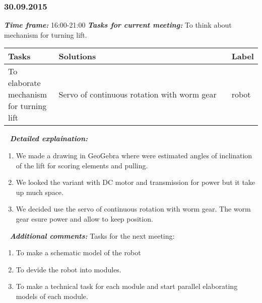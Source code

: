 \subsubsection{30.09.2015}
	\textit{\textbf{Time frame:}} 16:00-21:00 \newline
	\textit{\textbf{Tasks for current meeting:}} To think about mechanism for turning lift.

  \begin{table}[H]
	\vspace{-2mm}
	\begin{center}
		\begin{tabular}{|p{0.2\linewidth}|p{0.7\linewidth}|p{0.1\linewidth}|}
			\hline
			Tasks & Solutions & Label \\
			\hline
			To elaborate mechanism for turning lift & Servo of continuous rotation with worm gear & robot \\
			\hline
		\end{tabular}
	\end{center}
  \end{table}
  
   \newline
  \textit{\textbf{Detailed explaination:}}
  \begin{enumerate}
  	\item We made a drawing in GeoGebra where were estimated angles of inclination of the lift for scoring elements and pulling.
  	
  	\item We looked the variant with DC motor and transmission for power but it take up much space.
  	
  	\item We decided use the servo of continuous rotation with worm gear. The worm gear esure power and allow to keep position.
  	

  \end{enumerate}
  
   \newline
  \textit{\textbf{Additional comments:}} \newline
  Tasks for the next meeting:
  \begin{enumerate}
  	\item To make a schematic model of the robot
  	
  	\item To devide the robot into modules.
  	
  	\item To make a technical task for each module and start parallel elaborating models of each module.
  \end{enumerate}
  
\fillpage
